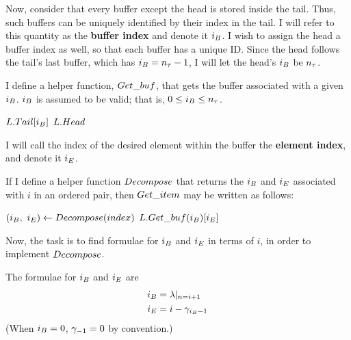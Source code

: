 Now, consider that every buffer except the head is stored inside the tail. Thus, such buffers can be uniquely identified by their index in the tail. I will refer to this quantity as the \textbf{buffer index} and denote it $i_B$. I wish to assign the head a buffer index as well, so that each buffer has a unique ID. Since the head follows the tail's last buffer, which has $i_B = n_\tau - 1$, I will let the head's $i_B$ be $n_\tau$.

I define a helper function, $\FuncGetBuffer$, that gets the buffer associated with a given $i_B$. $i_B$ is assumed to be valid; that is, $0 \leq i_B \leq n_\tau$.

\begin{algorithm}[H]
	\begin{algorithmic}
		\Function{$\FuncGetBuffer$}{$\VarList,\ \LclIndexBuffer$}
				\State \Return $L.Tail[i_B]$
			\Else
				\State \Return $L.Head$
			\EndIf
		\EndFunction
	\end{algorithmic}
\end{algorithm}

I will call the index of the desired element within the buffer the \textbf{element index}, and denote it $i_E$.

If I define a helper function $Decompose$ that returns the $i_B$ and $i_E$ associated with $i$ in an ordered pair, then $\FuncGetItem$ may be written as follows:

\begin{algorithm}[H]
	\begin{algorithmic}
		\Function{$\FuncGetItem$}{$\VarList,\ \ParamIndex$}
			\State $(i_B,\ i_E) \gets Decompose(index)$
			\State \Return $L.Get\_buf(i_B)[i_E]$
		\EndFunction
	\end{algorithmic}
\end{algorithm}

Now, the task is to find formulae for $i_B$ and $i_E$ in terms of $i$, in order to implement $Decompose$.

\begin{lemma}
	The formulae for $i_B$ and $i_E$ are
	\begin{align*}
	i_B &= \lambda|_{n = i + 1}\\
	i_E &= i - \gamma_{i_B - 1}
	\end{align*}
	(When $i_B = 0$, $\gamma_{-1} = 0$ by convention.)
\end{lemma}

